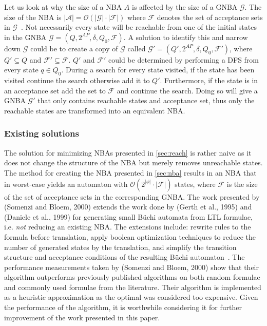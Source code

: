 Let us look at why the size of a NBA $A$ is affected by the size of a GNBA $\mathcal{G}$. The size of the NBA is $|\mathcal{A}| = \mathcal{O}(|\mathcal{G}| \cdot |\mathcal{F}|)$ where $\mathcal{F}$ denotes the set of acceptance sets in $\mathcal{G}$~\cite[thm. 4.56]{baier2008principles}. 
Not necessarily every state will be reachable from one of the initial states in the GNBA $\mathcal{G}=(Q,2^{AP},\delta,Q_0,\mathcal{F})$. A solution to identify this and narrow down $\mathcal{G}$ could be to create a copy of $\mathcal{G}$ called $\mathcal{G}'=(Q',2^{AP},\delta,Q_0,\mathcal{F}')$, where $Q' \subseteq Q$ and $\mathcal{F}' \subseteq \mathcal{F}$. $Q'$ and $\mathcal{F}'$ could be determined by performing a DFS from every state $q \in Q_0$. During a search for every state visited, if the state has been visited continue the search otherwise add it to $Q'$. Furthermore, if the state is in an acceptance set add the set to $\mathcal{F}$ and continue the search. Doing so will give a GNBA $\mathcal{G}'$ that only contains reachable states and acceptance set, thus only the reachable states are transformed into an equivalent NBA.

\subsubsection{Existing solutions}\label{sec:existing}
The solution for minimizing NBAs presented in \autoref{sec:reach} is rather naive as it does not change the structure of the NBA but merely removes unreachable states. The method for creating the NBA presented in \autoref{sec:nba} results in an NBA that in worst-case yields an automaton with $\mathcal{O}(2^{|\phi|} \cdot |\mathcal{F}|)$ states, where $\mathcal{F}$ is the size of the set of acceptance sets in the corresponding GNBA. The work presented by (Somenzi and Bloem, 2000)\cite{somenzi2000efficient} extends the work done by (Gerth et al., 1995)\cite{gerth1995simple} and (Daniele et al., 1999)\cite{daniele1999improved} for generating small Büchi automata from LTL formulae, i.e. \emph{not} reducing an existing NBA. The extensions include: rewrite rules to the formula before translation, apply boolean optimization techniques to reduce the number of generated states by the translation, and simplify the transition structure and acceptance conditions of the resulting Büchi automaton~\cite{somenzi2000efficient}. The performance measurements taken by (Somenzi and Bloem, 2000)\cite{somenzi2000efficient} show that their algorithm outperforms previously published algorithms on both random formulae and commonly used formulae from the literature. Their algorithm is implemented as a heuristic approximation as the optimal was considered too expensive. Given the performance of the algorithm, it is worthwhile considering it for further improvement of the work presented in this paper.

